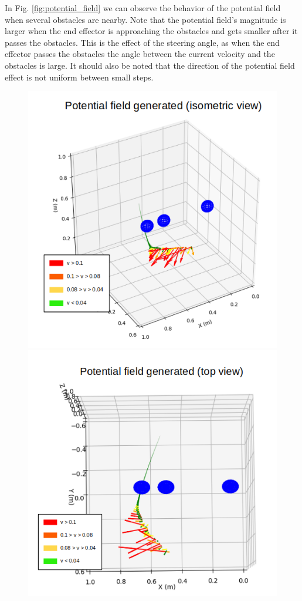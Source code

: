 \documentclass[a4paper, 10pt, conference]{ieeeconf}      %
\begin{document}
In Fig. \ref{fig:potential_field} we can observe the behavior of the potential field when several obstacles are nearby. Note that the potential field's magnitude is larger when the end effector is approaching the obstacles and gets smaller after it passes the obstacles. This is the effect of the steering angle, as when the end effector passes the obstacles the angle between the current velocity and the obstacles is large. It should also be noted that the direction of the potential field effect is not uniform between small steps.

\begin{figure}[H]
	\centering
	\includegraphics[scale=0.30]{images/potential_field.png}
	\includegraphics[scale=0.30]{images/potential_field_top.png}

\end{figure}
\end{document}

